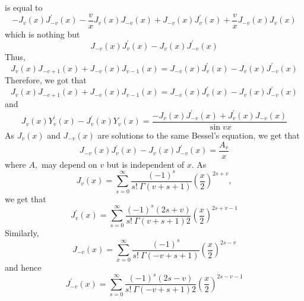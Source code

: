 is equal to
$$-J_{v}(x) J_{-v}^{\prime}(x)-\frac{v}{x} J_{v}(x) J_{-v}(x)+J_{-v}(x) J_{v}^{\prime}(x)+\frac{v}{x} J_{-v}(x) J_{v}(x)$$ 
which is nothing but
$$J_{-v}(x) J_{v}^{\prime}(x)-J_{v}(x) J_{-v}^{\prime}(x)$$
Thus, 
$$J_{v}(x) J_{-v+1}(x)+J_{-v}(x) J_{v-1}(x)=J_{-v}(x) J_{v}^{\prime}(x)-J_{v}(x) J_{-v}^{\prime}(x)$$
Therefore, we got that 
$$J_{v}(x) J_{-v+1}(x)+J_{-v}(x) J_{v-1}(x)=J_{-v}(x) J_{v}^{\prime}(x)-J_{v}(x) J_{-v}^{\prime}(x)$$ 
and
$$J_{v}(x) Y_{v}^{\prime}(x)-J_{v}^{\prime}(x) Y_{v}(x)=\frac{-J_{v}(x) J_{-v}^{\prime}(x)+J_{v}^{\prime}(x) J_{-v}(x)}{\sin v x}$$
As $J_{v}(x)$ and $J_{-v}(x)$ are solutions to the same Bessel's equation, we get that
$$J_{-v}(x) J_{v}^{\prime}(x)-J_{v}(x) J_{-v}^{\prime}(x)=\frac{A_{v}}{x}$$ 
where $A,$ may depend
on $v$ but is independent of $x$.
As 
$$J_{v}(x)=\sum_{s=0}^{\infty} \frac{(-1)^{s}}{s ! \  \Gamma(v+s+1)}\left(\frac{x}{2}\right)^{2 s+v},$$
we get that 
$$J_{v}^{\prime}(x)=\sum_{s=0}^{\infty} \frac{(-1)^{s}(2 s+v)}{s ! \  \Gamma(v+s+1) 2}\left(\frac{x}{2}\right)^{2 s+v-1}$$
Similarly, 
$$J_{-v}(x)=\sum_{x=0}^{\infty} \frac{(-1)^{s}}{s ! \  \Gamma(-v+s+1)}\left(\frac{x}{2}\right)^{2 s-v}$$ 
and hence
$$J_{-v}^{\prime}(x)=\sum_{s=0}^{\infty} \frac{(-1)^{s}(2 s-v)}{s ! \  \Gamma(-v+s+1) 2}\left(\frac{x}{2}\right)^{2 s-v-1}$$

